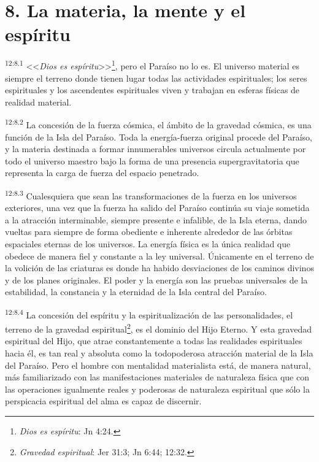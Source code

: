\section*{8. La materia, la mente y el espíritu}
\par
\textsuperscript{12:8.1} <<\textit{Dios es espíritu}>>\footnote{\textit{Dios es espíritu}: Jn 4:24.}, pero el Paraíso no lo es. El universo material es siempre el terreno donde tienen lugar todas las actividades espirituales; los seres espirituales y los ascendentes espirituales viven y trabajan en esferas físicas de realidad material.

\par
\textsuperscript{12:8.2} La concesión de la fuerza cósmica, el ámbito de la gravedad cósmica, es una función de la Isla del Paraíso. Toda la energía-fuerza original procede del Paraíso, y la materia destinada a formar innumerables universos circula actualmente por todo el universo maestro bajo la forma de una presencia supergravitatoria que representa la carga de fuerza del espacio penetrado.

\par
\textsuperscript{12:8.3} Cualesquiera que sean las transformaciones de la fuerza en los universos exteriores, una vez que la fuerza ha salido del Paraíso continúa su viaje sometida a la atracción interminable, siempre presente e infalible, de la Isla eterna, dando vueltas para siempre de forma obediente e inherente alrededor de las órbitas espaciales eternas de los universos. La energía física es la única realidad que obedece de manera fiel y constante a la ley universal. Únicamente en el terreno de la volición de las criaturas es donde ha habido desviaciones de los caminos divinos y de los planes originales. El poder y la energía son las pruebas universales de la estabilidad, la constancia y la eternidad de la Isla central del Paraíso.

\par
\textsuperscript{12:8.4} La concesión del espíritu y la espiritualización de las personalidades, el terreno de la gravedad espiritual\footnote{\textit{Gravedad espiritual}: Jer 31:3; Jn 6:44; 12:32.}, es el dominio del Hijo Eterno. Y esta gravedad espiritual del Hijo, que atrae constantemente a todas las realidades espirituales hacia él, es tan real y absoluta como la todopoderosa atracción material de la Isla del Paraíso. Pero el hombre con mentalidad materialista está, de manera natural, más familiarizado con las manifestaciones materiales de naturaleza física que con las operaciones igualmente reales y poderosas de naturaleza espiritual que sólo la perspicacia espiritual del alma es capaz de discernir.

